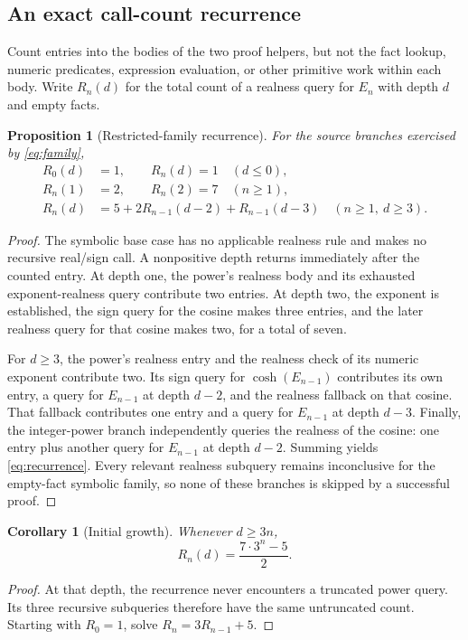 \documentclass[11pt,letterpaper]{article}
\newtheorem{proposition}{Proposition}
\newtheorem{corollary}{Corollary}
\begin{document}
\subsection{An exact call-count recurrence}

Count entries into the bodies of the two proof helpers, but not the fact lookup, numeric predicates, expression evaluation, or other primitive work within each body. Write $R_n(d)$ for the total count of a realness query for $E_n$ with depth $d$ and empty facts.

\begin{proposition}[Restricted-family recurrence]
For the source branches exercised by \eqref{eq:family},
\begin{align}
 R_0(d)&=1,\qquad R_n(d)=1\quad(d\leq0),\\
 R_n(1)&=2,\qquad R_n(2)=7\quad(n\geq1),\\
 R_n(d)&=5+2R_{n-1}(d-2)+R_{n-1}(d-3)
 \quad(n\geq1,\ d\geq3).
 \label{eq:recurrence}
\end{align}
\end{proposition}

\begin{proof}
The symbolic base case has no applicable realness rule and makes no recursive real/sign call. A nonpositive depth returns immediately after the counted entry. At depth one, the power's realness body and its exhausted exponent-realness query contribute two entries. At depth two, the exponent is established, the sign query for the cosine makes three entries, and the later realness query for that cosine makes two, for a total of seven.

For $d\geq3$, the power's realness entry and the realness check of its numeric exponent contribute two. Its sign query for $\cosh(E_{n-1})$ contributes its own entry, a query for $E_{n-1}$ at depth $d-2$, and the realness fallback on that cosine. That fallback contributes one entry and a query for $E_{n-1}$ at depth $d-3$. Finally, the integer-power branch independently queries the realness of the cosine: one entry plus another query for $E_{n-1}$ at depth $d-2$. Summing yields \eqref{eq:recurrence}. Every relevant realness subquery remains inconclusive for the empty-fact symbolic family, so none of these branches is skipped by a successful proof.
\end{proof}

\begin{corollary}[Initial growth]
Whenever $d\geq3n$,
\begin{equation}
 R_n(d)=\frac{7\cdot3^n-5}{2}.
 \label{eq:initial-growth}
\end{equation}
\end{corollary}
\begin{proof}
At that depth, the recurrence never encounters a truncated power query. Its three recursive subqueries therefore have the same untruncated count. Starting with $R_0=1$, solve $R_n=3R_{n-1}+5$.
\end{proof}
\end{document}
